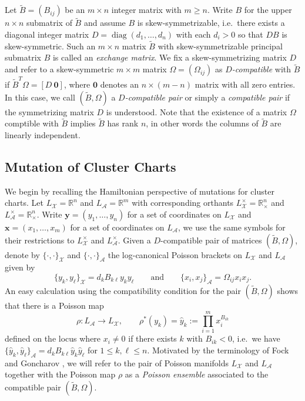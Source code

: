 \documentclass{amsart}
\numberwithin{equation}{section}
\newcommand{\bfx}{{\boldsymbol{x}}}
\newcommand{\bfy}{{\boldsymbol{y}}}
\newcommand{\cA}{\mathcal{A}}
\newcommand{\cX}{\mathcal{X}}
\newcommand{\RR}{\mathbb{R}}
\newcommand{\diag}{\operatorname{diag}}
\begin{document}
Let $\tilde B=(B_{ij})$ be an $m\times n$ integer matrix with $m\ge n$.
Write $B$ for the upper $n\times n$ submatrix of $\tilde B$ and assume $B$ is skew-symmetrizable, i.e.\ there exists a diagonal integer matrix $D=\diag(d_1,\ldots,d_n)$ with each $d_i>0$ so that $DB$ is skew-symmetric. 
Such an $m\times n$ matrix $\tilde B$ with skew-symmetrizable principal submatrix $B$ is called an \emph{exchange matrix}.
We fix a skew-symmetrizing matrix $D$ and refer to a skew-symmetric $m\times m$ matrix $\Omega=(\Omega_{ij})$ as \emph{$D$-compatible} with $\tilde B$ if $\tilde B^T\Omega=[D\ \boldsymbol{0}]$, where $\boldsymbol{0}$ denotes an $n\times(m-n)$ matrix with all zero entries.
In this case, we call $(\tilde B,\Omega)$ a \emph{$D$-compatible pair} or simply a \emph{compatible pair} if the symmetrizing matrix $D$ is understood.
Note that the existence of a matrix $\Omega$ comptible with $\tilde B$ implies $\tilde B$ has rank $n$, in other words the columns of $\tilde B$ are linearly independent.

\subsection{Mutation of Cluster Charts}
\label{sec:cluster mutations}

We begin by recalling the Hamiltonian perspective of mutations for cluster charts.
Let $L_\cX=\RR^n$ and $L_\cA=\RR^m$ with corresponding orthants $L^\times_\cX=\RR_\times^n$ and $L^\times_\cA=\RR_\times^n$.
Write $\bfy=(y_1,\ldots,y_n)$ for a set of coordinates on $L_\cX$ and $\bfx=(x_1,\ldots,x_m)$ for a set of coordinates on $L_\cA$, we use the same symbols for their restrictions to $L^\times_\cX$ and $L^\times_\cA$.
Given a $D$-compatible pair of matrices $(\tilde B,\Omega)$, denote by $\{\cdot,\cdot\}_\cX$ and $\{\cdot,\cdot\}_\cA$ the log-canonical Poisson brackets on $L_\cX$ and $L_\cA$ given by
\begin{equation}
  \label{eq:brackets}
  \{y_k,y_\ell\}_\cX=d_kB_{k\ell}y_ky_\ell\qquad\text{and}\qquad\{x_i,x_j\}_\cA=\Omega_{ij}x_ix_j.
\end{equation}
An easy calculation using the compatibility condition for the pair $(\tilde B,\Omega)$ shows that there is a Poisson map
\begin{equation}\label{eq:ensemble}
	\rho:L_\cA\to L_\cX,\qquad \rho^*(y_k)=\hat y_k:=\prod_{i=1}^m x_i^{B_{ik}}
\end{equation}
defined on the locus where $x_i\ne0$ if there exists $k$ with $B_{ik}<0$, i.e.\ we have $\{\hat y_k,\hat y_\ell\}_\cA=d_kB_{k\ell}\hat y_k\hat y_\ell$ for $1\le k,\ell\le n$.
Motivated by the terminology of Fock and Goncharov \cite{FG09a}, we will refer to the pair of Poisson manifolds $L_\cX$ and $L_\cA$ together with the Poisson map $\rho$ as a \emph{Poisson ensemble} associated to the compatible pair $(\tilde B,\Omega)$.
\end{document}
